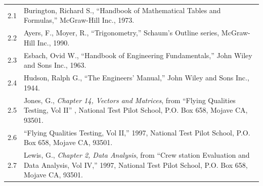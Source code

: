 \documentclass[
]{book}
\begin{document}
\begin{longtable}[]{@{}ll@{}}
\toprule
\endhead
\begin{minipage}[t]{0.06\columnwidth}\raggedright
2.1\strut
\end{minipage} & \begin{minipage}[t]{0.88\columnwidth}\raggedright
Burington, Richard S., ``Handbook of Mathematical Tables and Formulas,'' McGraw-Hill Inc., 1973.\strut
\end{minipage}\tabularnewline
\begin{minipage}[t]{0.06\columnwidth}\raggedright
2.2\strut
\end{minipage} & \begin{minipage}[t]{0.88\columnwidth}\raggedright
Ayers, F., Moyer, R., ``Trigonometry,'' Schaum's Outline series, McGraw-Hill Inc., 1990.\strut
\end{minipage}\tabularnewline
\begin{minipage}[t]{0.06\columnwidth}\raggedright
2.3\strut
\end{minipage} & \begin{minipage}[t]{0.88\columnwidth}\raggedright
Esbach, Ovid W., ``Handbook of Engineering Fundamentals,'' John Wiley and Sons Inc., 1963.\strut
\end{minipage}\tabularnewline
\begin{minipage}[t]{0.06\columnwidth}\raggedright
2.4\strut
\end{minipage} & \begin{minipage}[t]{0.88\columnwidth}\raggedright
Hudson, Ralph G., ``The Engineers' Manual,'' John Wiley and Sons Inc., 1944.\strut
\end{minipage}\tabularnewline
\begin{minipage}[t]{0.06\columnwidth}\raggedright
2.5\strut
\end{minipage} & \begin{minipage}[t]{0.88\columnwidth}\raggedright
Jones, G., \emph{Chapter 14, Vectors and Matrices}, from ``Flying Qualities Testing, Vol II'' , National Test Pilot School, P.O. Box 658, Mojave CA, 93501.\strut
\end{minipage}\tabularnewline
\begin{minipage}[t]{0.06\columnwidth}\raggedright
2.6\strut
\end{minipage} & \begin{minipage}[t]{0.88\columnwidth}\raggedright
``Flying Qualities Testing, Vol II,'' 1997, National Test Pilot School, P.O. Box 658, Mojave CA, 93501.\strut
\end{minipage}\tabularnewline
\begin{minipage}[t]{0.06\columnwidth}\raggedright
2.7\strut
\end{minipage} & \begin{minipage}[t]{0.88\columnwidth}\raggedright
Lewis, G., \emph{Chapter 2, Data Analysis}, from ``Crew station Evaluation and Data Analysis, Vol IV,'' 1997, National Test Pilot School, P.O. Box 658, Mojave CA, 93501.\strut
\end{minipage}\tabularnewline
\bottomrule
\end{longtable}
\end{document}
